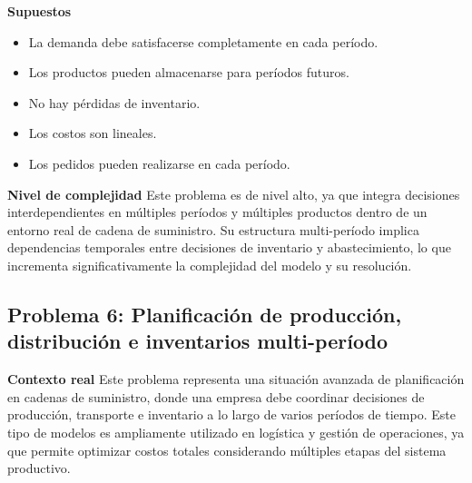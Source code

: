 \documentclass[12pt,a4paper]{article}
\begin{document}
\textbf{Supuestos}
\begin{itemize}[leftmargin=*]
	\item La demanda debe satisfacerse completamente en cada período.
	\item Los productos pueden almacenarse para períodos futuros.
	\item No hay pérdidas de inventario.
	\item Los costos son lineales.
	\item Los pedidos pueden realizarse en cada período.
\end{itemize}

\textbf{Nivel de complejidad} Este problema es de nivel alto, ya que integra decisiones interdependientes en múltiples períodos y múltiples productos dentro de un entorno real de cadena de suministro. Su estructura multi-período implica dependencias temporales entre decisiones de inventario y abastecimiento, lo que incrementa significativamente la complejidad del modelo y su resolución.

\subsection{Problema 6: Planificación de producción, distribución e inventarios multi-período}

\textbf{Contexto real} Este problema representa una situación avanzada de planificación en cadenas de suministro, donde una empresa debe coordinar decisiones de producción, transporte e inventario a lo largo de varios períodos de tiempo. Este tipo de modelos es ampliamente utilizado en logística y gestión de operaciones, ya que permite optimizar costos totales considerando múltiples etapas del sistema productivo.
\end{document}
